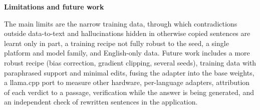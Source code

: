 \documentclass[11pt,a4paper]{article}
\newcommand{\sect}[1]{\par\medskip\noindent\textbf{\large #1}\par\smallskip}
\begin{document}
\sect{Limitations and future work}
The main limits are the narrow training data, through which contradictions outside data-to-text and hallucinations hidden
in otherwise copied sentences are learnt only in part, a training recipe not fully robust to the seed, a single platform
and model family, and English-only data. Future work includes a more robust recipe (bias correction, gradient clipping,
several seeds), training data with paraphrased support and minimal edits, fusing the adapter into the base weights, a
llama.cpp port to measure other hardware, per-language adapters, attribution of each verdict to a passage, verification
while the answer is being generated, and an independent check of rewritten sentences in the application.
\end{document}
